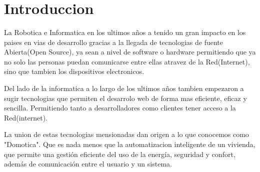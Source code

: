 \documentclass[letterpaper,12pt]{article}
\begin{document}
{\begin{center}
\begin{minipage}[b]{5cm}
			\end{minipage}\\
			[2cm]
			
			{\fontsize{12}{3}\selectfont{Colaborador :}}\\
			[0.5cm]
			{\fontsize{12}{3}\selectfont{Univ. Jorge Rolando Encinas}}\\
			[1.6cm]
			
			{\fontsize{12}{3}\selectfont{Cochabamba, 2018}}\\[1cm]
		\end{center}
		
		
		
		\vspace{1cm}
		\ %
		
		
		
		\tableofcontents
		\newpage
		
		
		
		\section{Introduccion}
		\vspace{1cm}
		
		La Robotica e Informatica en los ultimos años a tenido un gran impacto en los paises en vias de desarrollo gracias a la llegada de tecnologias de fuente Abierta(Open Source), ya sean a nivel de software o hardware  permitiendo que ya no solo las personas  puedan comunicarse entre ellas atravez de la Red(Internet), sino que tambien los dispositivos electronicos.
		
		Del lado de la informatica a lo largo de los ultimos años tambien  empezaron a sugir tecnologias que permiten el desarrolo web de forma mas eficiente, eficaz y sencilla. Permitiendo tanto a desarrolladores como clientes tener acceso  a la Red(internet).
		
		
		La union de estas tecnologias mensionadas dan origen a lo que conocemos como "Domotica". Que es nada menos que la automatizacion inteligente de un vivienda, que permite una gestión eficiente del uso de la energía, seguridad y confort, además de comunicación entre el usuario y un sistema. 
		
}
\end{document}
